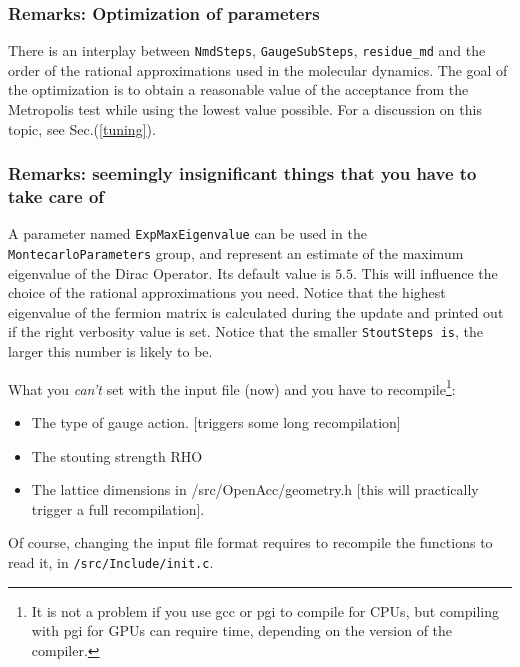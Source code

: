 \subsubsection{Remarks: Optimization of parameters}

There is an interplay between \verb|NmdSteps|, \verb|GaugeSubSteps|,
\verb|residue_md| and the order of the rational approximations used in the 
molecular dynamics. The goal of the optimization is to obtain a reasonable 
value of the acceptance from the Metropolis test while using the lowest value 
possible. For a discussion on this topic, see Sec.(\ref{tuning}).


\subsubsection{Remarks: seemingly insignificant things that you have to take 
care of}
A parameter named \verb|ExpMaxEigenvalue| can be used in the 
\verb|MontecarloParameters| group, and represent an estimate
of the maximum eigenvalue of the Dirac Operator. Its default value is $5.5$.  
This will influence  the choice of the rational approximations you need. 
Notice that the highest eigenvalue of the fermion matrix is calculated during 
the update and printed out if the right verbosity value is set. Notice that the 
smaller \verb|StoutSteps is|, the larger this number is likely to be. 

What you \emph{can't} set with the input file (now) and you have to
recompile\footnote{ It is not a problem if you use gcc or pgi to compile for 
    CPUs, but compiling with pgi for GPUs can require time, depending on the
version of the compiler.}:
\begin{itemize}
    \item The type of gauge action. [triggers some long recompilation]
    \item The stouting strength RHO 
    \item The lattice dimensions in /src/OpenAcc/geometry.h [this will
        practically trigger a full recompilation].
\end{itemize}
Of course, changing the input file format requires to recompile the functions 
to read it, in \verb|/src/Include/init.c|.

